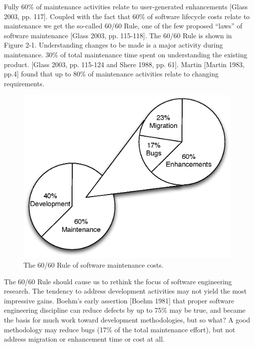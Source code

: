 Fully 60\% of maintenance activities relate to user-generated enhancements [Glass 2003, pp. 117].  Coupled with the fact that 60\% of software lifecycle costs relate to maintenance we get the so-called 60/60 Rule, one of the few proposed ``laws'' of software maintenance [Glass 2003, pp. 115-118].  The 60/60 Rule is shown in Figure 2-1.  Understanding changes to be made is a major activity during maintenance.  30\% of total maintenance time spent on understanding the existing product. [Glass 2003, pp. 115-124 and Shere 1988, pp. 61].  Martin [Martin 1983, pp.4] found that up to 80\% of maintenance activities relate to changing requirements.

\begin{figure}[htbp]
\begin{center}
\includegraphics[width=1.00\textwidth]{theory/images/Figure2-1}
\caption{The 60/60 Rule of software maintenance costs.}
\label{fig:2.1}
\end{center}
\end{figure}

The 60/60 Rule should cause us to rethink the focus of software engineering research.  The tendency to address development activities may not yield the most impressive gains.  Boehm's early assertion [Boehm 1981] that proper software engineering discipline can reduce defects by up to 75\% may be true, and became the basis for much work toward development methodologies, but so what?  A good methodology may reduce bugs (17\% of the total maintenance effort), but not address migration or enhancement time or cost at all.

